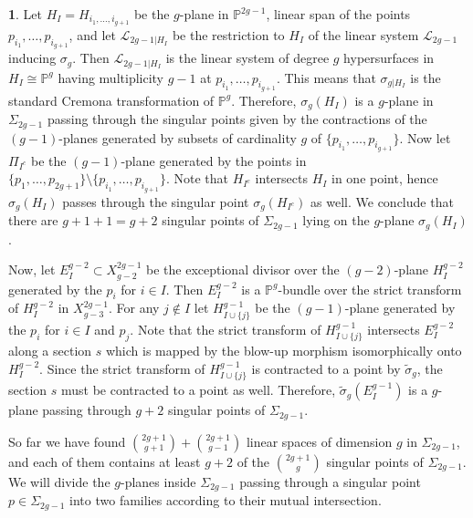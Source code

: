 \documentclass[a4paper,10pt]{amsart}
\theoremstyle{definition}
\newtheorem{say}[thm]{}
\begin{document}
\begin{say}\label{gplanes}
Let $H_{I} = H_{i_1,\dots,i_{g+1}}$ be the $g$-plane in $\mathbb{P}^{2g-1}$, linear span of the points $p_{i_1},\dots,p_{i_{g+1}}$, and let $\mathcal{L}_{2g-1|H_{I}}$ be the restriction to $H_I$ of the linear system $\mathcal{L}_{2g-1}$ inducing $\sigma_g$. Then $\mathcal{L}_{2g-1|H_I}$ is the linear system of degree $g$ hypersurfaces in $H_I\cong\mathbb{P}^g$ having multiplicity $g-1$ at $p_{i_1},\dots,p_{i_{g+1}}$. This means that $\sigma_{g|H_I}$ is the standard Cremona transformation of $\mathbb{P}^g$. Therefore, $\sigma_g(H_I)$ is a $g$-plane in $\Sigma_{2g-1}$ passing through the singular points given by the contractions of the $(g-1)$-planes generated by subsets of cardinality $g$ of $\{p_{i_1},\dots,p_{i_{g+1}}\}$. Now let $\Pi_{I^c}$ be the $(g-1)$-plane generated by the points in $\{p_1,\dots,p_{2g+1}\}\setminus\{p_{i_1},\dots,p_{i_{g+1}}\}$. Note that $H_{I^c}$ intersects $H_{I}$ in one point, hence $\sigma_g(H_I)$ passes through the singular point $\sigma_g(H_{I^c})$ as well. We conclude that there are $g+1+1 = g+2$ singular points of $\Sigma_{2g-1}$ lying on the $g$-plane $\sigma_g(H_I)$.

Now, let $E^{g-2}_I\subset X^{2g-1}_{g-2}$ be the exceptional divisor over the $(g-2)$-plane $H^{g-2}_I$ generated by the $p_i$ for $i\in I$. Then $E^{g-2}_I$ is a $\mathbb{P}^g$-bundle over the strict transform of $H^{g-2}_I$ in $X^{2g-1}_{g-3}$. For any $j\notin I$ let $H^{g-1}_{I\cup\{j\}}$ be the $(g-1)$-plane generated by the $p_i$ for $i\in I$ and $p_j$. Note that the strict transform of $H^{g-1}_{I\cup\{j\}}$ intersects $E^{g-2}_I$ along a section $s$ which is mapped by the blow-up morphism isomorphically onto $H^{g-2}_I$. Since the strict transform of $H^{g-1}_{I\cup\{j\}}$ is contracted to a point by $\tilde{\sigma}_g$, the section $s$ must be contracted to a point as well. Therefore, $\tilde{\sigma}_g(E_I^{g-1})$ is a $g$-plane passing through $g+2$ singular points of $\Sigma_{2g-1}$. 

So far we have found $\binom{2g+1}{g+1}+\binom{2g+1}{g-1}$ linear spaces of dimension $g$ in $\Sigma_{2g-1}$, and each of them contains at least $g+2$ of the $\binom{2g+1}{g}$ singular points of $\Sigma_{2g-1}$. We will divide the $g$-planes inside $\Sigma_{2g-1}$ passing through a singular point $p\in \Sigma_{2g-1}$ into two families according to their mutual intersection.
\end{say}
\end{document}
